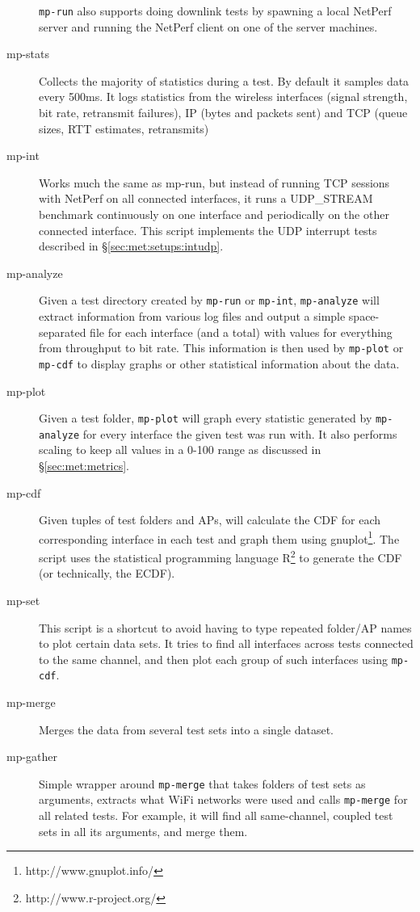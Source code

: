 \begin{description}
    \texttt{mp-run} also supports doing downlink tests by spawning a local
    NetPerf server and running the NetPerf client on one of the server machines.
  \item[mp-stats]
    Collects the majority of statistics during a test. By default it samples
    data every 500ms. It logs statistics from the wireless interfaces (signal
    strength, bit rate, retransmit failures), IP (bytes and packets sent) and
    TCP (queue sizes, RTT estimates, retransmits)
  \item[mp-int]
    Works much the same as mp-run, but instead of running TCP sessions with
    NetPerf on all connected interfaces, it runs a UDP\_STREAM benchmark
    continuously on one interface and periodically on the other connected
    interface. This script implements the UDP interrupt tests described in
    \S\ref{sec:met:setups:intudp}.
  \item[mp-analyze]
    Given a test directory created by \texttt{mp-run} or \texttt{mp-int},
    \texttt{mp-analyze} will extract information from various log files and
    output a simple space-separated file for each interface (and a total) with
    values for everything from throughput to bit rate. This information is then
    used by \texttt{mp-plot} or \texttt{mp-cdf} to display graphs or other
    statistical information about the data.
  \item[mp-plot]
    Given a test folder, \texttt{mp-plot} will graph every statistic generated
    by \texttt{mp-analyze} for every interface the given test was run with. It
    also performs scaling to keep all values in a 0-100 range as discussed in
    \S\ref{sec:met:metrics}.
  \item[mp-cdf]
    Given tuples of test folders and APs, will calculate the CDF for each
    corresponding interface in each test and graph them using
    gnuplot\footnote{http://www.gnuplot.info/}. The script uses the statistical
    programming language R\footnote{http://www.r-project.org/} to generate the
    CDF (or technically, the ECDF).
  \item[mp-set]
    This script is a shortcut to avoid having to type repeated folder/AP names
    to plot certain data sets. It tries to find all interfaces across tests
    connected to the same channel, and then plot each group of such interfaces
    using \texttt{mp-cdf}.
  \item[mp-merge]
    Merges the data from several test sets into a single dataset.
  \item[mp-gather]
    Simple wrapper around \texttt{mp-merge} that takes folders of test sets as
    arguments, extracts what WiFi networks were used and calls \texttt{mp-merge}
    for all related tests. For example, it will find all same-channel, coupled
    test sets in all its arguments, and merge them.
\end{description}

